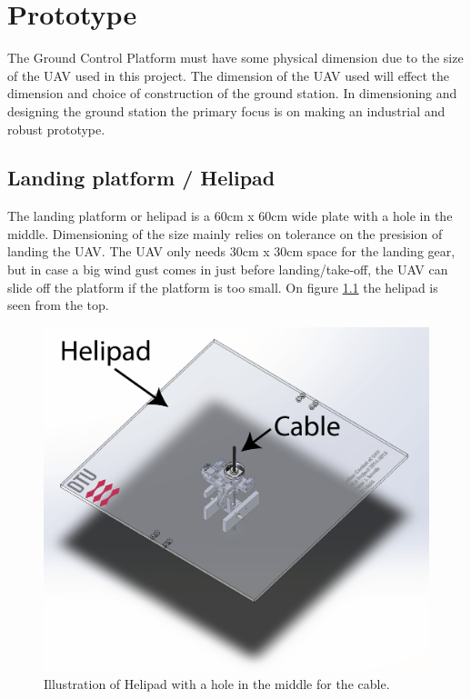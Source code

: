 
\chapter{Prototype}
The Ground Control Platform must have some physical dimension due to the size of the UAV used in this project. The dimension of the UAV used will effect the dimension and choice of construction of the ground station. In dimensioning and designing the ground station the primary focus is on making an industrial and robust prototype. 


\section{Landing platform / Helipad}
The landing platform or helipad is a 60cm x 60cm wide plate with a hole in the middle. Dimensioning of the size mainly relies on tolerance on the presision of landing the UAV. The UAV only needs 30cm x 30cm space for the landing gear, but in case a big wind gust comes in just before landing/take-off, the UAV can slide off the platform if the platform is too small. On figure \ref{fig:helipad} the helipad is seen from the top.

\begin{figure}[hbtp]
\centering
\includegraphics[scale=0.6]{graphics/cad/toplevel.png}
\caption{Illustration of Helipad with a hole in the middle for the cable.}
\label{fig:helipad}
\end{figure}

